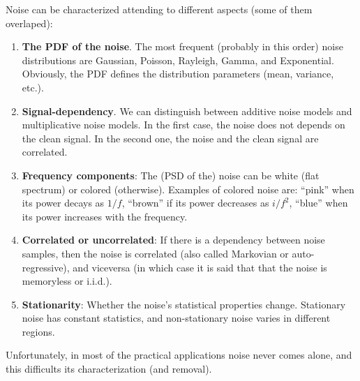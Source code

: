 Noise can be characterized attending to different aspects (some of them overlaped):
\begin{enumerate}
\item \textbf{The \gls{PDF} of the noise}. The most frequent (probably
  in this order) noise distributions are Gaussian, Poisson, Rayleigh,
  Gamma, and Exponential. Obviously, the \gls{PDF} defines the
  distribution parameters (mean, variance, etc.).
\item \textbf{Signal-dependency}. We can distinguish between additive
  noise models and multiplicative noise models. In the first case, the
  noise does not depends on the clean signal. In the second one, the
  noise and the clean signal are correlated.
\item \textbf{Frequency components}: The (\gls{PSD} of the) noise can
  be white (flat spectrum) or colored (otherwise). Examples of colored
  noise are: ``pink'' when its power decays as $1/f$, ``brown'' if its
  power decreases as $i/f^2$, ``blue'' when its power increases with
  the frequency.
\item \textbf{Correlated or uncorrelated}: If there is a dependency
  between noise samples, then the noise is correlated (also called Markovian or
  auto-regressive), and viceversa (in which case it is said that that
  the noise is memoryless or i.i.d.).
\item \textbf{Stationarity}: Whether the noise’s statistical
  properties change. Stationary noise has constant statistics, and
  non-stationary noise varies in different regions.
\end{enumerate}

Unfortunately, in most of the practical applications noise never comes
alone, and this difficults its characterization (and removal).

\begin{comment}
Noise can be additive or multiplicative. In the first case, noise is
signal independent between samples of the same signal instance, and
between samples of different instances, even if we consider the same
sample index. In the second case, the power of the noise depends on
the power of the signal, and therefore, if we can estimate the signal,
we can estimate, for example, the local variance of the noise after
supposing some statistical model. Notice, however, that in any case,
we must known, at least two (inevitable noisy) instances of the clean
signal.
\end{comment}

\begin{comment}
This requirement often presents a significant
challenge, particularly in contexts where samples are susceptible to
the degradation caused by the microscope radiation, thereby limiting
the feasibility of acquiring multiple such instances.

When this is not possible, one way to simulate having two or more
noisy instances of the same clean signal is to distribute the
pixels/voxels across two or more images/volumes (see Appendices
\ref{sec:EOS}, \ref{sec:CBS}, \ref{sec:ICBS}, \ref{sec:SCBS}, and
\ref{sec:SPRS}). Unfortunately, the splitting reduces the spatial
resolution at which the signal/noise parameters can be successfully
estudied.
\end{comment}

